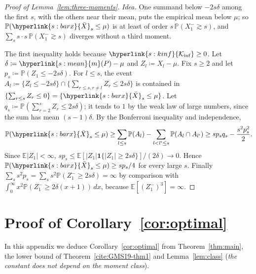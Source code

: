 \documentclass[11pt]{article}
\newcommand{\E}{\mathbb{E}}
\newcommand{\Prob}{\mathbb{P}}
\newcommand{\ind}{\mathbf{1}}
\newcommand{\sy}[2]{{\hyperlink{#1}{#2}}}
\newcommand{\mean}{\sy{s:mean}{m}}
\newcommand{\Kinf}{\sy{s:kinf}{\mathcal{K}_{\inf}}}
\newcommand{\bX}{\sy{s:barx}{\bar{X}}}
\begin{document}
\begin{proof}[Proof of Lemma~\ref{lem:three-moments}]
\emph{Idea.} One summand below $-2s\delta$ among the first $s$, with the others near their mean,
puts the empirical mean below $\mu$; so $\Prob(\bX_s\le\mu)$ is at least of order
$s\,\Prob(X_1^-\gtrsim s)$, and $\sum_s s\cdot s\,\Prob(X_1^-\gtrsim s)$ diverges without a third moment.

The first inequality holds because $\Kinf\ge0$. Let $\delta\coloneqq \mean(P)-\mu$ and
$Z_l\coloneqq X_l-\mu$. Fix $s\ge2$ and let $p_s\coloneqq\Prob(Z_1\le-2s\delta)$. For $l\le s$, the event
$A_l\coloneqq\{Z_l\le-2s\delta\}\cap\{\sum_{r\le s,r\ne l}Z_r\le2s\delta\}$ is contained in
$\{\sum_{r\le s}Z_r\le0\}=\{\bX_s\le\mu\}$. Let $q_s\coloneqq\Prob(\sum_{r=2}^sZ_r\le2s\delta)$; it tends
to $1$ by the weak law of large numbers, since the sum has mean $(s-1)\delta$. By the
Bonferroni inequality and independence,
\[
  \Prob(\bX_s\le\mu)\ge\sum_{l\le s}\Prob(A_l)-\sum_{l<l'\le s}\Prob(A_l\cap A_{l'})
  \ge sp_sq_s-\frac{s^2p_s^2}{2}.
\]
Since $\E|Z_1|<\infty$, $sp_s\le\E[|Z_1|\ind\{|Z_1|\ge2s\delta\}]/(2\delta)\to0$. Hence
$\Prob(\bX_s\le\mu)\ge sp_s/4$ for every large $s$. Finally
$\sum_ss^2p_s=\sum_ss^2\Prob(Z_1^-\ge2s\delta)=\infty$ by comparison with
$\int_0^\infty x^2\Prob(Z_1^-\ge2\delta(x+1))\,dx$, because $\E[(Z_1^-)^3]=\infty$.
\end{proof}

\section{Proof of Corollary~\ref{cor:optimal}}\label{sec:proof-optimal}

In this appendix we deduce Corollary~\ref{cor:optimal} from Theorem~\ref{thm:main}, the lower bound of
Theorem~\ref{cite:GMS19-thm1} and Lemma~\ref{lem:class} (\emph{the constant does not depend on the moment
class}).
\end{document}
